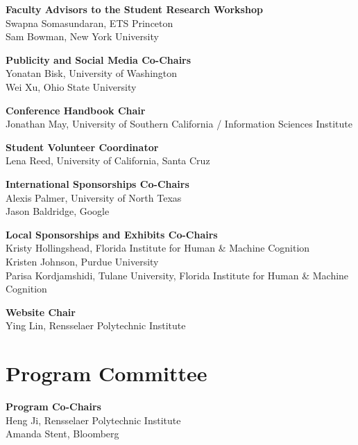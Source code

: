 {\bf Faculty Advisors to the Student Research Workshop} \\
Swapna Somasundaran, ETS Princeton\\
Sam Bowman, New York University

{\bf Publicity and Social Media Co-Chairs} \\
Yonatan Bisk, University of Washington \\
Wei Xu, Ohio State University

{\bf Conference Handbook Chair} \\
Jonathan May, University of Southern California / Information Sciences Institute

{\bf Student Volunteer Coordinator} \\
Lena Reed, University of California, Santa Cruz

{\bf International Sponsorships Co-Chairs} \\
Alexis Palmer, University of North Texas \\
Jason Baldridge, Google

{\bf Local Sponsorships and Exhibits Co-Chairs} \\
Kristy Hollingshead, Florida Institute for Human \& Machine Cognition\\
Kristen Johnson, Purdue University\\
Parisa Kordjamshidi, Tulane University, Florida Institute for Human \& Machine Cognition

{\bf Website Chair} \\
Ying Lin, Rensselaer Polytechnic Institute



\clearpage
\section{Program Committee}
\setlength{\parindent}{0pt}

\vspace*{0.5cm}

{\bf Program Co-Chairs} \\
Heng Ji, Rensselaer Polytechnic Institute\\
Amanda Stent, Bloomberg

